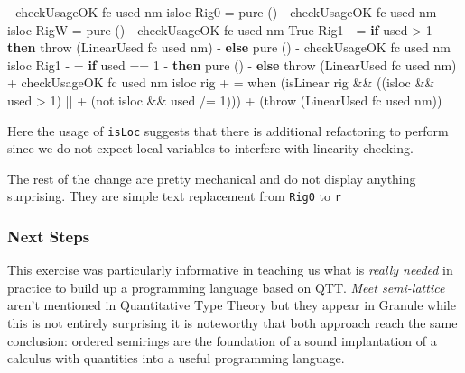 \documentclass[
]{article}
\newenvironment{Shaded}{}{}
\newcommand{\DataTypeTok}[1]{\textcolor[rgb]{0.56,0.13,0.00}{#1}}
\newcommand{\DecValTok}[1]{\textcolor[rgb]{0.25,0.63,0.44}{#1}}
\newcommand{\FunctionTok}[1]{\textcolor[rgb]{0.02,0.16,0.49}{#1}}
\newcommand{\KeywordTok}[1]{\textcolor[rgb]{0.00,0.44,0.13}{\textbf{#1}}}
\newcommand{\NormalTok}[1]{#1}
\newcommand{\OperatorTok}[1]{\textcolor[rgb]{0.40,0.40,0.40}{#1}}
\newcommand{\OtherTok}[1]{\textcolor[rgb]{0.00,0.44,0.13}{#1}}
\begin{document}
\begin{Shaded}
\begin{Highlighting}[]
\OperatorTok{{-}}\NormalTok{       checkUsageOK fc used nm isloc }\DataTypeTok{Rig0} \OtherTok{=} \FunctionTok{pure}\NormalTok{ ()}
\OperatorTok{{-}}\NormalTok{       checkUsageOK fc used nm isloc }\DataTypeTok{RigW} \OtherTok{=} \FunctionTok{pure}\NormalTok{ ()}
\OperatorTok{{-}}\NormalTok{       checkUsageOK fc used nm }\DataTypeTok{True} \DataTypeTok{Rig1}
\OperatorTok{{-}}           \OtherTok{=} \KeywordTok{if}\NormalTok{ used }\OperatorTok{\textgreater{}} \DecValTok{1}
\OperatorTok{{-}}                \KeywordTok{then}\NormalTok{ throw (}\DataTypeTok{LinearUsed}\NormalTok{ fc used nm)}
\OperatorTok{{-}}                \KeywordTok{else} \FunctionTok{pure}\NormalTok{ ()}
\OperatorTok{{-}}\NormalTok{       checkUsageOK fc used nm isloc }\DataTypeTok{Rig1}
\OperatorTok{{-}}           \OtherTok{=} \KeywordTok{if}\NormalTok{ used }\OperatorTok{==} \DecValTok{1}
\OperatorTok{{-}}                \KeywordTok{then} \FunctionTok{pure}\NormalTok{ ()}
\OperatorTok{{-}}                \KeywordTok{else}\NormalTok{ throw (}\DataTypeTok{LinearUsed}\NormalTok{ fc used nm)}
\OperatorTok{+}\NormalTok{       checkUsageOK fc used nm isloc rig}
\OperatorTok{+}           \OtherTok{=}\NormalTok{ when (isLinear rig }\OperatorTok{\&\&}\NormalTok{ ((isloc }\OperatorTok{\&\&}\NormalTok{ used }\OperatorTok{\textgreater{}} \DecValTok{1}\NormalTok{) }\OperatorTok{||} 
\OperatorTok{+}\NormalTok{                                    (}\FunctionTok{not}\NormalTok{ isloc }\OperatorTok{\&\&}\NormalTok{ used }\OperatorTok{/=} \DecValTok{1}\NormalTok{)))}
\OperatorTok{+}\NormalTok{                  (throw (}\DataTypeTok{LinearUsed}\NormalTok{ fc used nm))}
\end{Highlighting}
\end{Shaded}

Here the usage of \texttt{isLoc} suggests that there is additional
refactoring to perform since we do not expect local variables to
interfere with linearity checking.

The rest of the change are pretty mechanical and do not display anything
surprising. They are simple text replacement from \texttt{Rig0} to
\texttt{r}

\hypertarget{next-steps}{%
\subsubsection{Next Steps}\label{next-steps}}

This exercise was particularly informative in teaching us what is
\emph{really needed} in practice to build up a programming language
based on QTT. \emph{Meet semi-lattice} aren't mentioned in Quantitative
Type Theory\cite{qtt} but they appear in Granule \cite{granule} while
this is not entirely surprising it is noteworthy that both approach
reach the same conclusion: ordered semirings are the foundation of a
sound implantation of a calculus with quantities into a useful
programming language.
\end{document}
